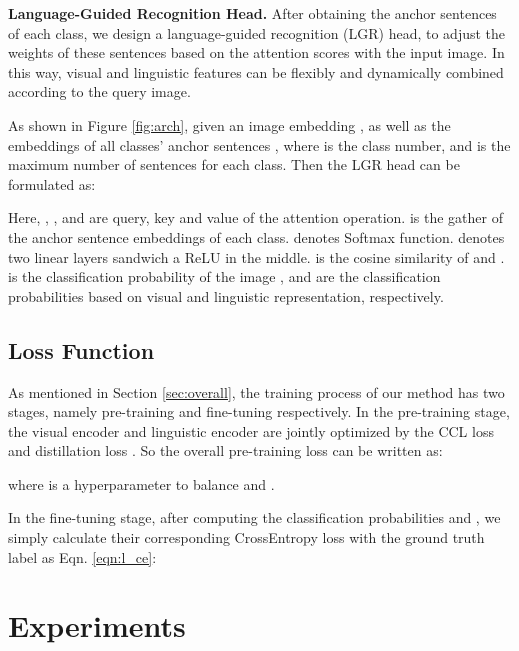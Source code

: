 \documentclass[runningheads]{llncs}
\begin{document}
\noindent\textbf{Language-Guided Recognition Head.}
After obtaining the anchor sentences of each class, we design a language-guided recognition (LGR) head, to adjust the weights of these sentences based on the attention scores with the input image.
In this way, visual and linguistic features can be flexibly and dynamically combined according to the query image.

As shown in Figure \ref{fig:arch}, given an image embedding , as well as the embeddings of all classes' anchor sentences , where  is the class number, and  is the maximum number of sentences for each class. Then the LGR head can be formulated as:

Here, , , and  are query, key and value of the attention operation.
 is the gather of the  anchor sentence embeddings of each class.
 denotes Softmax function.
 denotes two linear layers sandwich a ReLU in the middle.
 is the cosine similarity of  and .
 is the classification probability of the image ,  and  are the classification probabilities based on visual and linguistic representation, respectively.

\subsection{Loss Function}

As mentioned in Section \ref{sec:overall}, the training process of our method has two stages, namely pre-training and fine-tuning respectively.
In the pre-training stage, the visual encoder and linguistic encoder are jointly optimized by the CCL loss  and distillation loss . So the overall pre-training loss can be written as:

where  is a hyperparameter to balance  and .

In the fine-tuning stage, after computing the classification probabilities  and , we simply calculate their corresponding CrossEntropy loss  with the ground truth label  as Eqn. \ref{eqn:l_ce}:


\section{Experiments}
\end{document}
